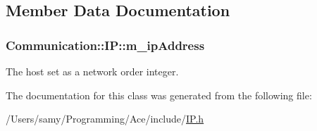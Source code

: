 \subsection{Member Data Documentation}
\hypertarget{class_communication_1_1_i_p_aeb8f550723eb60248dce5638e177d3da}{}
\subsubsection[{m\+\_\+ip\+Address}]{ Communication\+::\+I\+P\+::m\+\_\+ip\+Address\hspace{0.3cm}{\ttfamily [private]}}\label{class_communication_1_1_i_p_aeb8f550723eb60248dce5638e177d3da}


The host set as a network order integer. 



The documentation for this class was generated from the following file\+:\begin{DoxyCompactItemize}
\item 
/\+Users/samy/\+Programming/\+Ace/include/\hyperlink{_i_p_8h}{I\+P.\+h}\end{DoxyCompactItemize}

